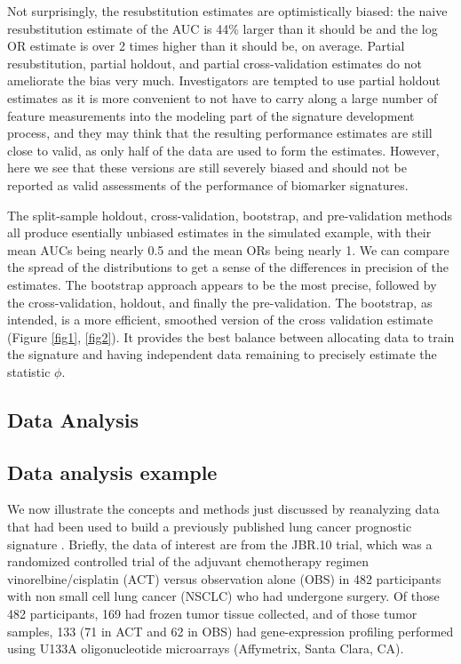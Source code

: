 \documentclass[11pt,]{article}
\begin{document}
Not surprisingly, the resubstitution estimates are optimistically
biased: the naive resubstitution estimate of the AUC is 44\% larger than
it should be and the log OR estimate is over 2 times higher than it
should be, on average. Partial resubstitution, partial holdout, and
partial cross-validation estimates do not ameliorate the bias very much.
Investigators are tempted to use partial holdout estimates as it is more
convenient to not have to carry along a large number of feature
measurements into the modeling part of the signature development
process, and they may think that the resulting performance estimates are
still close to valid, as only half of the data are used to form the
estimates. However, here we see that these versions are still severely
biased and should not be reported as valid assessments of the
performance of biomarker signatures.

The split-sample holdout, cross-validation, bootstrap, and
pre-validation methods all produce esentially unbiased estimates in the
simulated example, with their mean AUCs being nearly 0.5 and the mean
ORs being nearly 1. We can compare the spread of the distributions to
get a sense of the differences in precision of the estimates. The
bootstrap approach appears to be the most precise, followed by the
cross-validation, holdout, and finally the pre-validation. The
bootstrap, as intended, is a more efficient, smoothed version of the
cross validation estimate (Figure \ref{fig1}, \ref{fig2}). It provides
the best balance between allocating data to train the signature and
having independent data remaining to precisely estimate the statistic
\(\phi\).

\subsection{Data Analysis}\label{data-analysis}

\subsection{Data analysis example}\label{data-analysis-example}

We now illustrate the concepts and methods just discussed by reanalyzing
data that had been used to build a previously published lung cancer
prognostic signature \citet{zhu2010prognostic}. Briefly, the data of
interest are from the JBR.10 trial, which was a randomized controlled
trial of the adjuvant chemotherapy regimen vinorelbine/cisplatin (ACT)
versus observation alone (OBS) in 482 participants with non small cell
lung cancer (NSCLC) who had undergone surgery. Of those 482
participants, 169 had frozen tumor tissue collected, and of those tumor
samples, 133 (71 in ACT and 62 in OBS) had gene-expression profiling
performed using U133A oligonucleotide microarrays (Affymetrix, Santa
Clara, CA).
\end{document}
